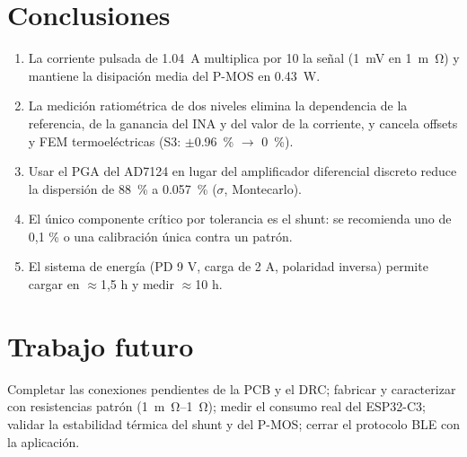 \documentclass[11pt,a4paper]{article}
\begin{document}
\section{Conclusiones}
\begin{enumerate}[nosep]
\item La corriente pulsada de \SI{1,04}{A} multiplica por 10 la señal (\SI{1}{mV} en \SI{1}{m\ohm}) y mantiene la disipación media del P-MOS en \SI{0,43}{W}.
\item La medición ratiométrica de dos niveles elimina la dependencia de la referencia, de la ganancia del INA y del valor de la corriente, y cancela offsets y FEM termoeléctricas (S3: $\pm$\SI{0,96}{\percent} $\to$ \SI{0}{\percent}).
\item Usar el PGA del AD7124 en lugar del amplificador diferencial discreto reduce la dispersión de \SI{88}{\percent} a \SI{0,057}{\percent} ($\sigma$, Montecarlo).
\item El único componente crítico por tolerancia es el shunt: se recomienda uno de 0,1 \% o una calibración única contra un patrón.
\item El sistema de energía (PD 9 V, carga de 2 A, polaridad inversa) permite cargar en $\approx$1,5 h y medir $\approx$10 h.
\end{enumerate}

\section{Trabajo futuro}
Completar las conexiones pendientes de la PCB y el DRC; fabricar y caracterizar con resistencias patrón (\SI{1}{m\ohm}--\SI{1}{\ohm}); medir el consumo real del ESP32-C3; validar la estabilidad térmica del shunt y del P-MOS; cerrar el protocolo BLE con la aplicación.

\appendix
\end{document}
